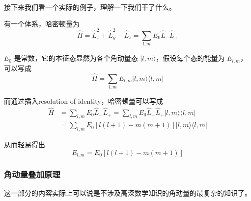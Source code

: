 接下来我们看一个实际的例子，理解一下我们干了什么。

\begin{example}{}
有一个体系，哈密顿量为
\begin{equation}
\hat H = \hat L_x^2 + \hat L_y^2 -\hat  L_z = \sum_{l,m} E_0 \hat L_-\hat L_+
\end{equation}

$E_0$ 是常数，它的本征态显然为各个角动量态 $|l,m\rangle$，假设每个态的能量为 $E_{l,m}$，可以写成
\begin{equation}
\hat H = \sum_{l,m}E_{l,m}|l,m\rangle\langle l,m|
\end{equation}

而通过插入resolution of identity，哈密顿量可以写成
\begin{equation}
\begin{split}
\hat H &= \sum_{l,m} E_0 \hat L_-\hat L_+ = \sum_{l,m} E_0 \hat L_-\hat L_+ |l,m\rangle \langle l,m|\\ &= \sum_{l,m} E_0 \left[l(l+1)-m(m+1)\right]|l,m\rangle \langle l,m|
\end{split}
\end{equation}

从而轻易得出
\begin{equation}
E_{l,m} = E_0 \left[l(l+1)-m(m+1)\right]
\end{equation}
\end{example}

\subsubsection{角动量叠加原理}

这一部分的内容实际上可以说是不涉及高深数学知识的角动量的最复杂的知识了。

